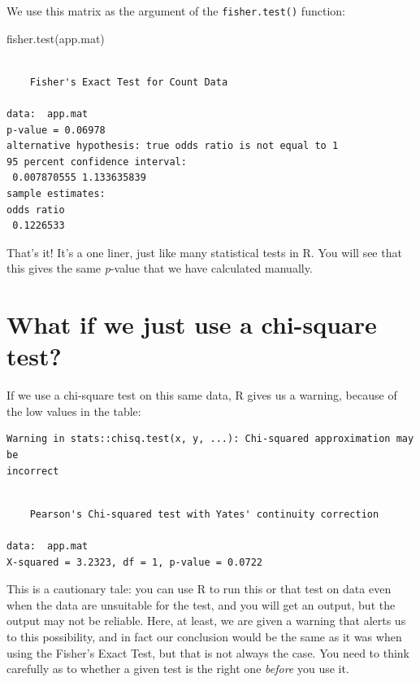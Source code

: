 \documentclass[
  letterpaper,
  DIV=11,
  numbers=noendperiod]{scrreprt}
\newenvironment{Shaded}{\begin{snugshade}}{\end{snugshade}}
\newcommand{\FunctionTok}[1]{\textcolor[rgb]{0.28,0.35,0.67}{#1}}
\newcommand{\NormalTok}[1]{\textcolor[rgb]{0.00,0.23,0.31}{#1}}
\begin{document}
We use this matrix as the argument of the \texttt{fisher.test()}
function:

\begin{Shaded}
\begin{Highlighting}[]
\FunctionTok{fisher.test}\NormalTok{(app.mat)}
\end{Highlighting}
\end{Shaded}

\begin{verbatim}

    Fisher's Exact Test for Count Data

data:  app.mat
p-value = 0.06978
alternative hypothesis: true odds ratio is not equal to 1
95 percent confidence interval:
 0.007870555 1.133635839
sample estimates:
odds ratio 
 0.1226533 
\end{verbatim}

That's it! It's a one liner, just like many statistical tests in R. You
will see that this gives the same \emph{p}-value that we have calculated
manually.

\section{What if we just use a chi-square
test?}\label{what-if-we-just-use-a-chi-square-test}

If we use a chi-square test on this same data, R gives us a warning,
because of the low values in the table:

\begin{verbatim}
Warning in stats::chisq.test(x, y, ...): Chi-squared approximation may be
incorrect
\end{verbatim}

\begin{verbatim}

    Pearson's Chi-squared test with Yates' continuity correction

data:  app.mat
X-squared = 3.2323, df = 1, p-value = 0.0722
\end{verbatim}

This is a cautionary tale: you can use R to run this or that test on
data even when the data are unsuitable for the test, and you will get an
output, but the output may not be reliable. Here, at least, we are given
a warning that alerts us to this possibility, and in fact our conclusion
would be the same as it was when using the Fisher's Exact Test, but that
is not always the case. You need to think carefully as to whether a
given test is the right one \emph{before} you use it.
\end{document}
